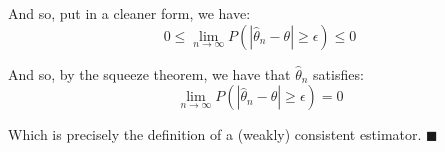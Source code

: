 \documentclass{article}
\begin{document}
And so, put in a cleaner form, we have:
$$0\le\lim_{n\to\infty}P(|\hat\theta_n-\theta|\ge\epsilon)\le0$$

And so, by the squeeze theorem, we have that $\hat\theta_n$ satisfies:
$$\lim_{n\to\infty}P(|\hat\theta_n-\theta|\ge\epsilon)=0$$

Which is precisely the definition of a (weakly) consistent estimator. $\blacksquare$
\end{document}
